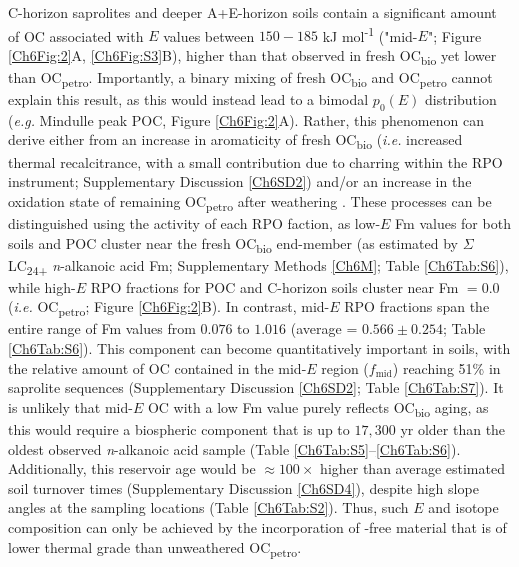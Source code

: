 C-horizon saprolites and deeper A+E-horizon soils contain a significant amount of OC associated with $E$ values between $150 - 185$ kJ mol\textsuperscript{-1} ("mid-$E$"; Figure \ref{Ch6Fig:2}A, \ref{Ch6Fig:S3}B), higher than that observed in fresh OC\textsubscript{bio} yet lower than OC\textsubscript{petro}. Importantly, a binary mixing of fresh OC\textsubscript{bio} and OC\textsubscript{petro} cannot explain this result, as this would instead lead to a bimodal $p_{0}(E)$ distribution (\textit{e.g.} Mindulle peak POC, Figure \ref{Ch6Fig:2}A). Rather, this phenomenon can derive either from an increase in aromaticity of fresh OC\textsubscript{bio} (\textit{i.e.} increased thermal recalcitrance, with a small contribution due to charring within the RPO instrument; Supplementary Discussion \ref{Ch6SD2}) and/or an increase in the oxidation state of remaining OC\textsubscript{petro} after weathering \citep[\textit{i.e.} decreased thermal recalcitrance; Chapter \ref{Ch3}][]{Williams:2014bq}. These processes can be distinguished using the  activity of each RPO faction, as low-$E$ Fm values for both soils and POC cluster near the fresh OC\textsubscript{bio} end-member (as estimated by $\Sigma$LC\textsubscript{24+} \textit{n}-alkanoic acid Fm; Supplementary Methods \ref{Ch6M}; Table \ref{Ch6Tab:S6}), while high-$E$ RPO fractions for POC and C-horizon soils cluster near Fm $= 0.0$ (\textit{i.e.} OC\textsubscript{petro}; Figure \ref{Ch6Fig:2}B). In contrast, mid-$E$ RPO fractions span the entire range of Fm values from $0.076$ to $1.016$ (average = $0.566 \pm 0.254$; Table \ref{Ch6Tab:S6}). This component can become quantitatively important in soils, with the relative amount of OC contained in the mid-$E$ region ($f_{\text{mid}}$) reaching 51\% in saprolite sequences (Supplementary Discussion \ref{Ch6SD2}; Table \ref{Ch6Tab:S7}). It is unlikely that mid-$E$ OC with a low Fm value purely reflects OC\textsubscript{bio} aging, as this would require a biospheric component that is up to $17,300$  yr older than the oldest observed \textit{n}-alkanoic acid sample (Table \ref{Ch6Tab:S5}--\ref{Ch6Tab:S6}). Additionally, this reservoir age would be $\approx 100\times$ higher than average estimated soil turnover times (Supplementary Discussion \ref{Ch6SD4}), despite high slope angles at the sampling locations (Table \ref{Ch6Tab:S2}). Thus, such $E$ and isotope composition can only be achieved by the incorporation of -free material that is of lower thermal grade than unweathered OC\textsubscript{petro}. 

